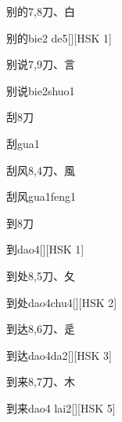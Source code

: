 \begin{entry}{别的}{7,8}{⼑、⽩}
  \begin{phonetics}{别的}{bie2 de5}[][HSK 1]
  \end{phonetics}
\end{entry}

\begin{entry}{别说}{7,9}{⼑、⾔}
  \begin{phonetics}{别说}{bie2shuo1}
  \end{phonetics}
\end{entry}

\begin{entry}{刮}{8}{⼑}
  \begin{phonetics}{刮}{gua1}
  \end{phonetics}
\end{entry}

\begin{entry}{刮风}{8,4}{⼑、⾵}
  \begin{phonetics}{刮风}{gua1feng1}
  \end{phonetics}
\end{entry}

\begin{entry}{到}{8}{⼑}
  \begin{phonetics}{到}{dao4}[][HSK 1]
  \end{phonetics}
\end{entry}

\begin{entry}{到处}{8,5}{⼑、⼡}
  \begin{phonetics}{到处}{dao4chu4}[][HSK 2]
  \end{phonetics}
\end{entry}

\begin{entry}{到达}{8,6}{⼑、⾡}
  \begin{phonetics}{到达}{dao4da2}[][HSK 3]
  \end{phonetics}
\end{entry}

\begin{entry}{到来}{8,7}{⼑、⽊}
  \begin{phonetics}{到来}{dao4 lai2}[][HSK 5]
  \end{phonetics}
\end{entry}

